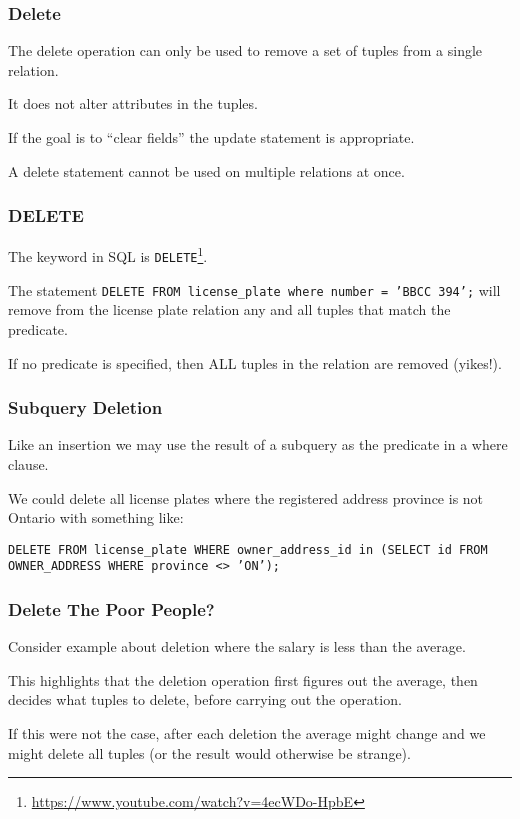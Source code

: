 \begin{frame}
\frametitle{Delete}

The delete operation can only be used to remove a set of tuples from a single relation.

It does not alter attributes in the tuples. 

If the goal is to ``clear fields'' the update statement is appropriate. 

A delete statement cannot be used on multiple relations at once.


\end{frame}



\begin{frame}
\frametitle{DELETE}

The keyword in SQL is \texttt{DELETE}\footnote{\url{https://www.youtube.com/watch?v=4ecWDo-HpbE}}. 

The statement \texttt{DELETE FROM license\_plate where number = 'BBCC 394';} will remove from the license plate relation any and all tuples that match the predicate. 

If no predicate is specified, then ALL tuples in the relation are removed (yikes!).

\end{frame}



\begin{frame}
\frametitle{Subquery Deletion}


Like an insertion we may use the result of a subquery as the predicate in a where clause. 

We could delete all license plates where the registered address province is not Ontario with something like: 

\texttt{DELETE FROM license\_plate WHERE owner\_address\_id in (SELECT id FROM OWNER\_ADDRESS WHERE province <> 'ON');}

\end{frame}



\begin{frame}
\frametitle{Delete The Poor People?}

Consider example about deletion where the salary is less than the average. 

This highlights that the deletion operation first figures out the average, then decides what tuples to delete, before carrying out the operation. 

If this were not the case, after each deletion the average might change and we might delete all tuples (or the result would otherwise be strange). 


\end{frame}




